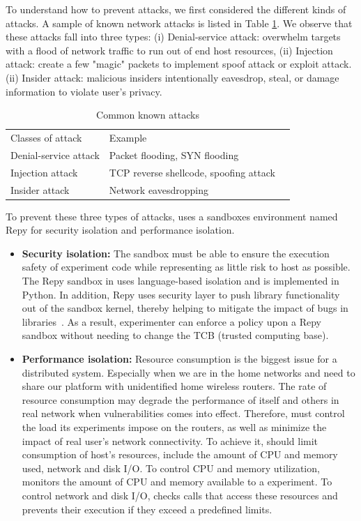 To understand how to prevent attacks, we first considered the different kinds of attacks. A sample of known network attacks is listed in Table \ref{table: attack}. We observe that these attacks fall into three types: (i) Denial-service attack: overwhelm targets with a flood of network traffic to run out of end host resources, (ii) Injection attack: create a few "magic" packets to implement spoof attack or exploit attack. (ii) Insider attack: malicious insiders intentionally eavesdrop, steal, or damage information to violate user's privacy.

\begin{table}[]
\centering
\begin{tabular}{|l|l|l}
\cline{1-2}
Classes of attack     & Example                                 &  \\ \cline{1-2}
Denial-service attack & Packet flooding, SYN flooding\cite{eddy2011syn}             &  \\ \cline{1-2}
Injection attack      & TCP reverse shellcode\cite{shellcode},  spoofing attack\cite{bishop1996attack} &  \\ \cline{1-2}
Insider attack        & Network eavesdropping                   &  \\ \cline{1-2}
\end{tabular}
\caption{Common known attacks}
\label{table: attack}
\end{table}

To prevent these three types of attacks, \sysname uses a sandboxes environment named Repy for security isolation and performance isolation. 
\begin{itemize} 
\item \textbf{Security isolation:} The sandbox must be able to ensure the execution safety of experiment code while representing as little risk to host as possible. The Repy sandbox in \sysname uses language-based isolation and is implemented in Python. In addition, Repy uses security layer to push library functionality out of the sandbox kernel, thereby helping to mitigate the impact of bugs in libraries~\cite{cappos2010retaining}. As a result, experimenter can enforce a policy upon a Repy sandbox without needing to change the TCB (trusted computing base).  
\item \textbf{Performance isolation:} Resource consumption is the biggest issue for a distributed system. Especially when we are in the home networks and need to share our platform with unidentified home wireless routers. The rate of resource consumption may degrade the performance of itself and others in real network when vulnerabilities comes into effect\cite{joshi2013survey}. Therefore, \sysname must control the load its experiments impose on the routers, as well as minimize the impact of real user's network connectivity. To achieve it, \sysname should limit consumption of host's resources, include the amount of CPU and memory used, network and disk I/O. To control CPU and memory utilization, \sysname monitors the amount of CPU and memory available to a experiment. To control network and disk I/O, \sysname checks calls that access these resources and prevents their execution if they exceed a predefined limits. 
\end{itemize}


